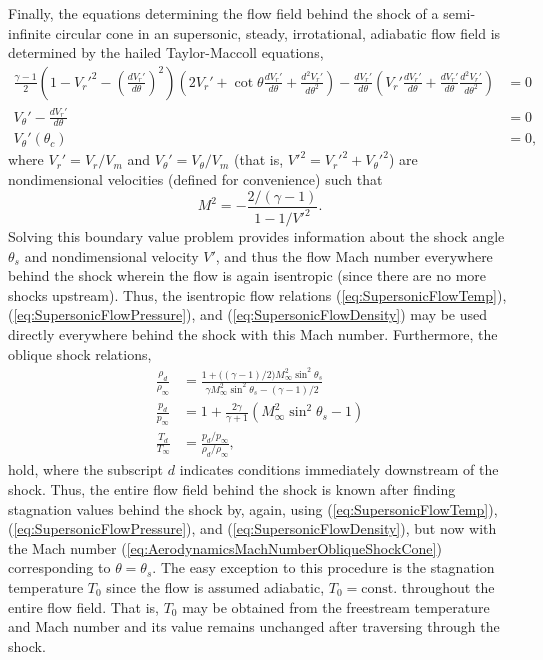 \documentclass[11pt,dvipsnames]{thesis}
\begin{document}
Finally, the equations determining the flow field behind the shock of a semi-infinite circular cone in an supersonic, steady, irrotational, adiabatic flow field is determined by the hailed Taylor-Maccoll equations,
\begin{align}
\!\!\!\frac{\gamma - 1}{2}\left(1 - {V_r'}^2 - \left(\frac{d V_r'}{d\theta}\right)^{\!2}\right) \left(2 V_r' + \cot\theta \frac{d V_r'}{d\theta} + \frac{d^2 V_r'}{d\theta^2}\right) - \frac{d V_r'}{d\theta}\left(V_r'\frac{d V_r'}{d\theta} + \frac{d V_r'}{d\theta} \frac{d^2 V_r'}{d\theta^2}\right) &= 0 \\
V_\theta' - \frac{d V_r'}{d\theta} &= 0 \\
V_\theta'(\theta_c) &= 0,
\end{align}
where $V_r' = V_r / V_m$ and $V_\theta' = V_\theta / V_m$ (that is, ${V'}^2 = {V_r'}^2 + {V_\theta'}^2$) are nondimensional velocities (defined for convenience) such that 
\begin{equation}
M^2 = -\frac{2 / (\gamma - 1)}{1 - 1/{V'}^2}. \label{eq:AerodynamicsMachNumberObliqueShockCone}
\end{equation}
Solving this boundary value problem provides information about the shock angle $\theta_s$ and nondimensional velocity $V'$, and thus the flow Mach number everywhere behind the shock wherein the flow is again isentropic (since there are no more shocks upstream). Thus, the isentropic flow relations (\ref{eq:SupersonicFlowTemp}), (\ref{eq:SupersonicFlowPressure}), and (\ref{eq:SupersonicFlowDensity}) may be used directly everywhere behind the shock with this Mach number. Furthermore, the oblique shock relations,
\begin{align}
\frac{\rho_d}{\rho_\infty} &= \frac{1 + \big((\gamma - 1)/2\big) M_\infty^2 \sin^2\theta_s}{\gamma M_\infty^2 \sin^2\theta_s - (\gamma - 1)/2} \label{eq:AerodynamicsObliqueShockrho} \\
\frac{p_d}{p_\infty} &= 1 + \frac{2\gamma}{\gamma + 1}(M_\infty^2 \sin^2\theta_s - 1) \label{eq:AerodynamicsObliqueShockp} \\
\frac{T_d}{T_\infty} &= \frac{p_d/p_\infty}{\rho_d/\rho_\infty}, \label{eq:AerodynamicsObliqueShockT}
\end{align}
hold, where the subscript $d$ indicates conditions immediately downstream of the shock. Thus, the entire flow field behind the shock is known after finding stagnation values behind the shock by, again, using (\ref{eq:SupersonicFlowTemp}), (\ref{eq:SupersonicFlowPressure}), and (\ref{eq:SupersonicFlowDensity}), but now with the Mach number (\ref{eq:AerodynamicsMachNumberObliqueShockCone}) corresponding to $\theta = \theta_s$.
The easy exception to this procedure is the stagnation temperature $T_0$ since the flow is assumed adiabatic, $T_0 = \mathrm{const.}$ throughout the entire flow field. That is, $T_0$ may be obtained from the freestream temperature and Mach number and its value remains unchanged after traversing through the shock.
\end{document}
